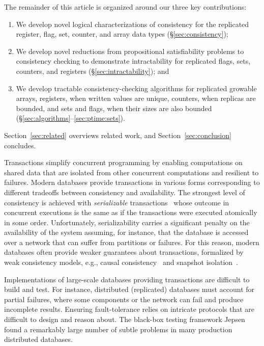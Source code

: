 The remainder of this article is organized around our three key contributions:
\begin{enumerate}

  \item We develop novel logical characterizations of consistency for the replicated register, flag, set, counter, and array data types (§\ref{sec:consistency});

  \item We develop novel reductions from propositional satisfiability problems to consistency checking to demonstrate intractability for replicated flags, sets, counters, and registers (§\ref{sec:intractability}); and

  \item We develop tractable consistency-checking algorithms for replicated growable arrays, registers, when written values are unique, counters, when replicas are bounded, and sets and flags, when their sizes are also bounded (§\ref{sec:algorithms}–\ref{sec:ptime:sets}).

\end{enumerate}
Section~\ref{sec:related} overviews related work, and Section~\ref{sec:conclusion} concludes.





Transactions simplify concurrent programming by enabling computations on shared data that are isolated from other concurrent computations and resilient to failures. Modern databases provide transactions in various forms corresponding to different tradeoffs between consistency and availability. The strongest level of consistency is achieved with \emph{serializable} transactions~\cite{DBLP:journals/jacm/Papadimitriou79b} whose outcome in concurrent executions is the same as if the transactions were executed atomically in some order. Unfortunately, serializability carries a significant penalty on the availability of the system assuming, for instance, that the database is accessed over a network that can suffer from partitions or failures. For this reason, modern databases often provide weaker guarantees about transactions, formalized by weak consistency models, e.g., causal consistency~\cite{DBLP:journals/cacm/Lamport78} and snapshot isolation~\cite{DBLP:conf/sigmod/BerensonBGMOO95}.

Implementations of large-scale databases providing transactions are difficult to build and test. For instance, distributed (replicated) databases must account for partial failures, where some components or the network can fail and produce incomplete results. Ensuring fault-tolerance relies on intricate protocols that are difficult to design and reason about. The black-box testing framework Jepsen~\cite{jepsen} found a remarkably large number of subtle problems in many production distributed databases. %

